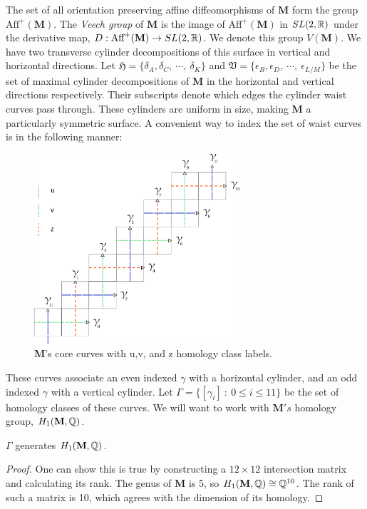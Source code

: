 \documentclass[]{article}
\def\bM{\mathbf{M}}
\begin{document}
\noindent The set of all orientation preserving affine diffeomorphisms of $\bM$ form the group $\text{Aff}^+(\bM)$. The \emph{Veech group} of $\bM$ is the image of $\text{Aff}^+(\bM)$ in $SL(2,\mathbb{R})$ under the derivative map, $D:\text{Aff}^+(\bM)\rightarrow SL(2,\RR)$. We denote this group $V(\bM)$. We have two transverse cylinder decompositions of this surface in vertical and horizontal directions. Let $\mathfrak{H}=\{\delta_A,\delta_C,~\cdots,~\delta_K \}$ and $\mathfrak{V}=\{\epsilon_B,\epsilon_D,~\cdots,~\epsilon_{L/M} \}$ be the set of maximal cylinder decompositions of $\bM$ in the horizontal and vertical directions respectively. Their subscripts denote which edges the cylinder waist curves pass through. These cylinders are uniform in size, making $\bM$ a particularly symmetric surface. A convenient way to index the set of waist curves is in the following manner:

\begin{figure}[H]
\includegraphics[width=3in]{homologyclass.png}
\centering
\caption{$\bM$'s core curves with u,v, and z homology class labels.}
\label{fig:homology}
\end{figure}

These curves associate an even indexed $\gamma$ with a horizontal cylinder, and an odd indexed $\gamma$ with a vertical cylinder. Let $\Gamma=\{[\gamma_i]~:~0\leq i \leq 11\}$ be the set of homology classes of these curves. We will want to work with $\bM's$ homology group, $H_1(\bM,\QQ)$.

\begin{lem}
$\Gamma$ generates $H_1(\bM,\QQ)$.
\begin{proof}
One can show this is true by constructing a $12\times 12$ intersection matrix and calculating its rank. The genus of $\bM$ is 5, so $H_1(\bM,\QQ)\cong\QQ^{10}$. The rank of such a matrix is 10, which agrees with the dimension of its homology.
\end{proof}
\end{lem}
\end{document}
